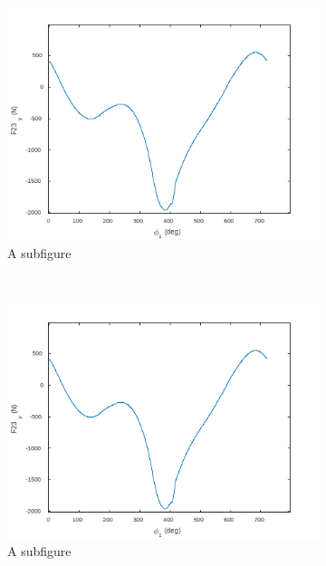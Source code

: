 \begin{figure}
	\centering
	\begin{subfigure}{.3\textwidth}
		\centering
		\includegraphics[width=\linewidth]{09}
		\caption{A subfigure}
		\label{fig:sub1}
	\end{subfigure}~
	\begin{subfigure}{.3\textwidth}
		\centering
		\includegraphics[width=\linewidth]{09}
		\caption{A subfigure}
		\label{fig:sub2}
	\end{subfigure}~
	\begin{subfigure}{.3\textwidth}
		\centering

\end{subfigure}
\end{figure}
